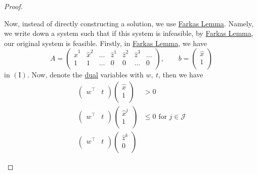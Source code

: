 \begin{proof}
\begin{enumerate}
		      Now, instead of directly constructing a solution, we use \hyperref[lma:Farkas]{Farkas Lemma}. Namely, we write down a system such that if this system is infeasible, by \hyperref[lma:Farkas]{Farkas Lemma}, our original system is feasible. Firstly, in \hyperref[lma:Farkas]{Farkas Lemma}, we have
		      \[
			      A = \begin{pmatrix}
				      \hat{x}^1 & \hat{x}^2 & \dots & \hat{z}^1 & \hat{z}^2 & \hat{z}^3 & \dots \\
				      1         & 1         & \dots & 0         & 0         & \dots     & 0     \\
			      \end{pmatrix},\qquad b = \begin{pmatrix}
				      \hat{x} \\
				      1       \\
			      \end{pmatrix}
		      \]
		      in \((\mathrm{I})\). Now, denote the \hyperref[def:dual]{dual} variables with \(w,\ t\), then we have
		      \[
			      \begin{split}
				      \begin{pmatrix}
					      w^{\top} & t \\
				      \end{pmatrix}\begin{pmatrix}
					                   \hat{x} \\
					                   1       \\
				                   \end{pmatrix} & >0                                 \\
				      \begin{pmatrix}
					      w^{\top} & t \\
				      \end{pmatrix}\begin{pmatrix}
					                   \hat{x}^j \\
					                   1         \\
				                   \end{pmatrix} & \leq 0 \text{ for }j\in\mathcal{J} \\
				      \begin{pmatrix}
					      w^{\top} & t \\
				      \end{pmatrix}\begin{pmatrix}
					                   \hat{z}^k \\
					                   0         \\

\end{pmatrix}
\end{split}\]
\end{enumerate}
\end{proof}

